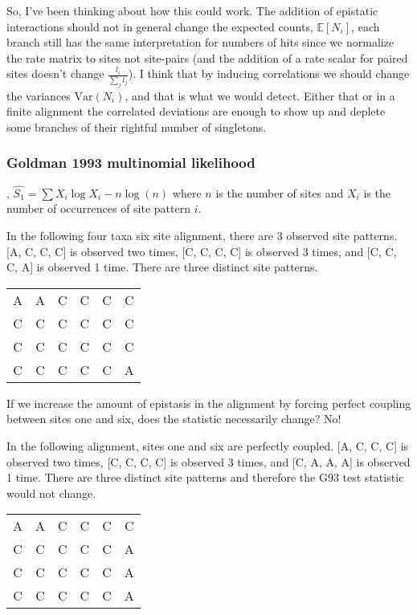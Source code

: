 \documentclass[11pt]{article}
\begin{document}
So, I've been thinking about how this could work.
The addition of epistatic interactions should not in general change the expected counts, $\mathbb{E}[N_i]$, each branch still has the same interpretation for numbers of hits since we normalize the rate matrix to sites not site-pairs (and the addition of a rate scalar for paired sites doesn't change $\frac{l_i}{\sum_j l_j}$).
I think that by inducing correlations we should change the variances $\text{Var}(N_i)$, and that is what we would detect.
Either that or in a finite alignment the correlated deviations are enough to show up and deplete some branches of their rightful number of singletons.

\subsubsection*{Goldman 1993 multinomial likelihood}

\cite{goldman1993statistical}, $\hat{S_1} = \sum X_i \log{X_i} - n \log(n)$ where $n$ is the number of sites and $X_i$ is the number of occurrences of site pattern $i$.

In the following four taxa six site alignment, there are 3 observed site patterns.
[A, C, C, C] is observed two times, [C, C, C, C] is observed 3 times, and [C, C, C, A] is observed 1 time.
There are three distinct site patterns.

\begin{center}
\begin{tabular}{ |c|c|c|c|c|c|}
 \hline
A & A & C &  C & C & C \\
C & C & C &  C & C & C \\
C & C & C &  C & C & C \\
C & C & C  &  C & C & A\\
 \hline
\end{tabular}
\end{center}

If we increase the amount of epistasis in the alignment by forcing perfect coupling between sites one and six, does the statistic necessarily change?
No!

In the following alignment, sites one and six are perfectly coupled.
[A, C, C, C] is observed two times, [C, C, C, C] is observed 3 times, and [C, A, A, A] is observed 1 time.
There are three distinct site patterns and therefore the G93 test statistic would not change.

\begin{center}
\begin{tabular}{ |c|c|c|c|c|c|}
 \hline
A & A & C &  C & C & C \\
C & C & C &  C & C & A \\
C & C & C &  C & C & A \\
C & C & C  &  C & C & A\\
 \hline
\end{tabular}
\end{center}
\end{document}
